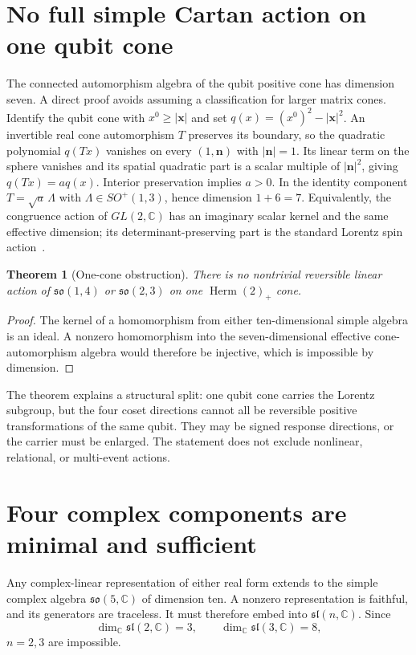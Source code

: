 \documentclass[11pt]{article}
\newtheorem{theorem}{Theorem}[section]
\theoremstyle{remark}\newtheorem{remark}[theorem]{Remark}
\newcommand{\Herm}{\operatorname{Herm}}
\newcommand{\so}{\mathfrak{so}}
\begin{document}
\section{No full simple Cartan action on one qubit cone}

The connected automorphism algebra of the qubit positive cone has dimension
seven.
A direct proof avoids assuming a classification for larger matrix cones.
Identify the qubit cone with $x^0\geq|\boldsymbol x|$ and set
$q(x)=(x^0)^2-|\boldsymbol x|^2$.
An invertible real cone automorphism $T$ preserves its boundary, so the
quadratic polynomial $q(Tx)$ vanishes on every $(1,\boldsymbol n)$ with
$|\boldsymbol n|=1$.
Its linear term on the sphere vanishes and its spatial quadratic part is a
scalar multiple of $|\boldsymbol n|^2$, giving $q(Tx)=a q(x)$.
Interior preservation implies $a>0$.
In the identity component $T=\sqrt a\,\Lambda$ with
$\Lambda\in SO^+(1,3)$, hence dimension $1+6=7$.
Equivalently, the congruence action of $GL(2,\mathbb C)$ has an imaginary
scalar kernel and the same effective dimension; its determinant-preserving
part is the standard Lorentz spin action~\cite{ArrighiPatricotLorentz}.

\begin{theorem}[One-cone obstruction]
\label{thm:qubit-obstruction}
There is no nontrivial reversible linear action of $\so(1,4)$ or $\so(2,3)$ on one
$\Herm(2)_+$ cone.
\end{theorem}

\begin{proof}
The kernel of a homomorphism from either ten-dimensional simple algebra is an ideal.  A
nonzero homomorphism into the seven-dimensional effective cone-automorphism algebra would
therefore be injective, which is impossible by dimension.
\end{proof}

The theorem explains a structural split: one qubit cone carries the Lorentz subgroup, but
the four coset directions cannot all be reversible positive transformations of the same
qubit.  They may be signed response directions, or the carrier must be enlarged.  The
statement does not exclude nonlinear, relational, or multi-event actions.

\section{Four complex components are minimal and sufficient}

Any complex-linear representation of either real form extends to the simple complex
algebra $\so(5,\mathbb C)$ of dimension ten.  A nonzero representation is faithful, and its
generators are traceless.  It must therefore embed into $\mathfrak{sl}(n,\mathbb C)$.  Since
\begin{equation}
 \dim_\mathbb C\mathfrak{sl}(2,\mathbb C)=3,\qquad
 \dim_\mathbb C\mathfrak{sl}(3,\mathbb C)=8,
 \label{eq:minimal-dimension}
\end{equation}
$n=2,3$ are impossible.
\end{document}

